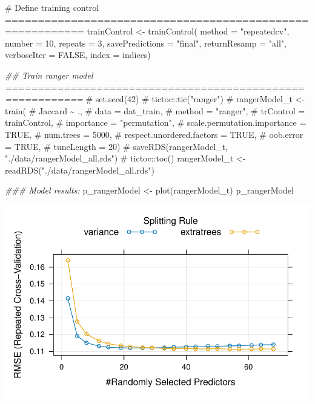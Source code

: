 \documentclass[
  letterpaper,
  DIV=11,
  numbers=noendperiod]{scrartcl}
\newenvironment{Shaded}{\begin{snugshade}}{\end{snugshade}}
\newcommand{\AttributeTok}[1]{\textcolor[rgb]{0.40,0.45,0.13}{#1}}
\newcommand{\CommentTok}[1]{\textcolor[rgb]{0.37,0.37,0.37}{#1}}
\newcommand{\ConstantTok}[1]{\textcolor[rgb]{0.56,0.35,0.01}{#1}}
\newcommand{\DecValTok}[1]{\textcolor[rgb]{0.68,0.00,0.00}{#1}}
\newcommand{\DocumentationTok}[1]{\textcolor[rgb]{0.37,0.37,0.37}{\textit{#1}}}
\newcommand{\FunctionTok}[1]{\textcolor[rgb]{0.28,0.35,0.67}{#1}}
\newcommand{\NormalTok}[1]{\textcolor[rgb]{0.00,0.23,0.31}{#1}}
\newcommand{\OtherTok}[1]{\textcolor[rgb]{0.00,0.23,0.31}{#1}}
\newcommand{\StringTok}[1]{\textcolor[rgb]{0.13,0.47,0.30}{#1}}
\begin{document}
\begin{Shaded}
\begin{Highlighting}[]
\CommentTok{\# Define training control ==========================================================}
\NormalTok{trainControl }\OtherTok{\textless{}{-}} \FunctionTok{trainControl}\NormalTok{(}
    \AttributeTok{method =} \StringTok{"repeatedcv"}\NormalTok{,}
    \AttributeTok{number =} \DecValTok{10}\NormalTok{,}
    \AttributeTok{repeats =} \DecValTok{3}\NormalTok{,}
    \AttributeTok{savePredictions =} \StringTok{"final"}\NormalTok{,}
    \AttributeTok{returnResamp =} \StringTok{"all"}\NormalTok{,}
    \AttributeTok{verboseIter =} \ConstantTok{FALSE}\NormalTok{,}
    \AttributeTok{index =}\NormalTok{ indices)}

\DocumentationTok{\#\# Train ranger model ==========================================================}
\CommentTok{\# set.seed(42)}
\CommentTok{\# tictoc::tic("ranger")}
\CommentTok{\# rangerModel\_t \textless{}{-} train(}
\CommentTok{\#     Jaccard \textasciitilde{} .,}
\CommentTok{\#     data = dat\_train,}
\CommentTok{\#     method = "ranger",}
\CommentTok{\#     trControl = trainControl,}
\CommentTok{\#     importance = "permutation",}
\CommentTok{\#     scale.permutation.importance = TRUE,}
\CommentTok{\#     num.trees = 5000,}
\CommentTok{\#     respect.unordered.factors = TRUE,}
\CommentTok{\#     oob.error = TRUE,}
\CommentTok{\#     tuneLength = 20)}
\CommentTok{\# saveRDS(rangerModel\_t, "./data/rangerModel\_all.rds")}
\CommentTok{\# tictoc::toc()}
\NormalTok{rangerModel\_t }\OtherTok{\textless{}{-}} \FunctionTok{readRDS}\NormalTok{(}\StringTok{"./data/rangerModel\_all.rds"}\NormalTok{)}

\DocumentationTok{\#\#\# Model results:}
\NormalTok{p\_rangerModel }\OtherTok{\textless{}{-}} \FunctionTok{plot}\NormalTok{(rangerModel\_t)}
\NormalTok{p\_rangerModel}
\end{Highlighting}
\end{Shaded}

\includegraphics{MachineLearning_StaticPatterNN_Report_files/figure-pdf/hyperparameter-tuning-1.pdf}
\end{document}
